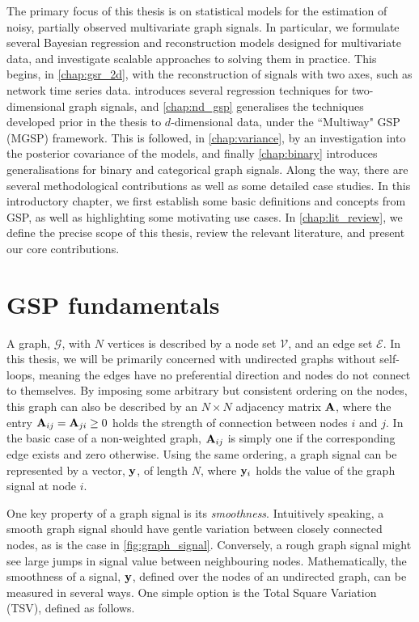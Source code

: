 The primary focus of this thesis is on statistical models for the estimation of noisy, partially observed multivariate graph signals. In particular, we formulate several Bayesian regression and reconstruction models designed for multivariate data, and investigate scalable approaches to solving them in practice. This begins, in \cref{chap:gsr_2d}, with the reconstruction of signals with two axes, such as network time series data.  introduces several regression techniques for two-dimensional graph signals, and \cref{chap:nd_gsp} generalises the techniques developed prior in the thesis to $d$-dimensional data, under the ``Multiway" GSP (MGSP) framework. This is followed, in \cref{chap:variance}, by an investigation into the posterior covariance of the models, and finally \cref{chap:binary} introduces generalisations for binary and categorical graph signals. Along the way, there are several methodological contributions as well as some detailed case studies. In this introductory chapter, we first establish some basic definitions and concepts from GSP, as well as highlighting some motivating use cases. In \cref{chap:lit_review}, we define the precise scope of this thesis, review the relevant literature, and present our core contributions. 


\section{GSP fundamentals}

A graph, $\mathcal{G}$, with $N$ vertices is described by a node set $\mathcal{V}$, and an edge set $\mathcal{E}$. In this thesis, we will be primarily concerned with undirected graphs without self-loops, meaning the edges have no preferential direction and nodes do not connect to themselves. By imposing some arbitrary but consistent ordering on the nodes, this graph can also be described by an $N \times N$ adjacency matrix $\mathbf{A}$, where the entry $\mathbf{A}_{ij} = \mathbf{A}_{ji} \geq 0$ holds the strength of connection between nodes $i$ and $j$. In the basic case of a non-weighted graph, $\mathbf{A}_{ij}$ is simply one if the corresponding edge exists and zero otherwise. Using the same ordering, a graph signal can be represented by a vector, $\mathbf{y}$, of length $N$, where $\mathbf{y}_i$ holds the value of the graph signal at node $i$. 

One key property of a graph signal is its \textit{smoothness}. Intuitively speaking, a smooth graph signal should have gentle variation between closely connected nodes, as is the case in \cref{fig:graph_signal}. Conversely, a rough graph signal might see large jumps in signal value between neighbouring nodes. Mathematically, the smoothness of a signal, $\mathbf{y}$, defined over the nodes of an undirected graph, can be measured in several ways. One simple option is the Total Square Variation (TSV), defined as follows. 

